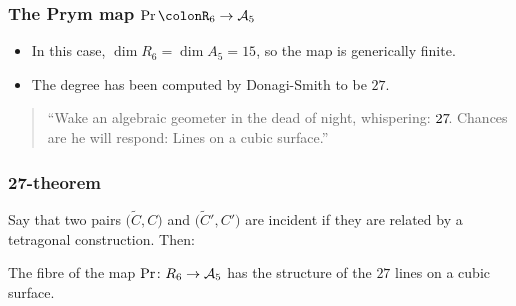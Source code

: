 \begin{frame}
\frametitle{The Prym map $\operatorname{Pr}\colonR_6 \to \A_5$}

\begin{itemize}
	\item In this case, $\dim R_6 = \dim A_5 = 15$, so the map is generically finite.
	\pause
	\item The degree has  been computed by Donagi-Smith to be $27$.
\end{itemize}

\pause

\vfill
\begin{quote}
    \large
    ``Wake an algebraic geometer in the dead of night, \phantom{``}whispering: $27\mkern-3mu$. Chances are he will respond: Lines on a \phantom{``}cubic surface.''
\end{quote}
\vfill

\end{frame}

\begin{frame}
\frametitle{27-theorem}

Say that two pairs $\Big(\widetilde C, C\Big)$ and $\Big(\widetilde C', C'\Big)$ are \alert{incident} if they are related by a tetragonal construction. Then:


\begin{theorem}
The fibre of the map $\mathrm{Pr}\colon R_6 \to \mathcal{A}_5$ has the structure of the $27$ lines on a cubic surface.
\end{theorem}

\end{frame}